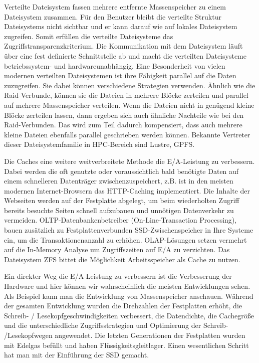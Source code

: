 Verteilte Dateisystem fassen mehrere entfernte Massenspeicher zu einem Dateisystem zusammen. Für den Benutzer bleibt die verteilte Struktur Dateisystems nicht sichtbar und er kann darauf wie auf lokales Dateisystem zugreifen. Somit erfüllen die verteilte Dateisysteme das Zugriffstransparenzkriterium. Die Kommunikation mit dem Dateisystem läuft über eine fest definierte Schnittstelle ab und macht die verteilten Dateisysteme betriebssystem- und hardwareunabhängig. Eine Besonderheit von vielen modernen verteilten Dateisystemen ist ihre Fähigkeit parallel auf die Daten zuzugreifen. Sie dabei können verschiedene Strategien verwenden. Ähnlich wie die Raid-Verbunde, können sie die Dateien in mehrere Blöcke zerteilen und parallel auf mehrere Massenspeicher verteilen.  {\color{red} Wenn die Dateien nicht in genügend kleine Blöcke zerteilen lassen, dann ergeben sich auch ähnliche Nachteile wie bei den Raid-Verbunden. Das wird zum Teil dadurch kompensiert, dass auch mehrere kleine Dateien ebenfalls parallel geschrieben werden können.} Bekannte Vertreter dieser Dateisystemfamilie in HPC-Bereich sind Lustre, GPFS. 

Die Caches eine weitere weitverbreitete Methode die E/A-Leistung zu verbessern. Dabei werden die oft genutzte oder voraussichtlich bald benötigte Daten auf einem schnelleren Datenträger zwischenzuspeichert, z.B. ist in den meisten modernen Internet-Browsern das HTTP-Caching implementiert. Die Inhalte der Webseiten werden auf der Festplatte abgelegt, um beim wiederholten Zugriff bereits besuchte Seiten schnell aufzubauen und unnötigen Datenverkehr zu vermeiden. 
OLTP-Datenbankenbetreiber (On-Line-Transaction Processing), bauen zusätzlich zu Festplattenverbunden SSD-Zwischenspeicher in Ihre Systeme ein, um die Transaktionenanzahl zu erhöhen. 
OLAP-Lösungen setzen vermehrt auf die In-Memory Analyse um Zugriffszeiten auf E/A zu verzichten.
Das Dateisystem ZFS bittet die Möglichkeit Arbeitsspeicher als Cache zu nutzen. 

Ein direkter Weg die E/A-Leistung zu verbessern ist die Verbesserung der Hardware und hier können wir wahrscheinlich die meisten Entwicklungen sehen. Als Beispiel kann man die Entwicklung von Massenspeicher anschauen. Während der gesamten Entwicklung wurden die Drehzahlen der Festplatten erhöht, die Schreib- / Lesekopfgeschwindigkeiten verbessert, die Datendichte, die Cachegröße und die unterschiedliche Zugriffsstrategien und Optimierung der Schreib- /Lesekopfwegen angewendet. Die letzten Generationen der Festplatten wurden mit Edelgas befüllt und haben Flüssigkeitsgleitlager. Einen wesentlichen Schritt hat man mit der Einführung der SSD gemacht. 

